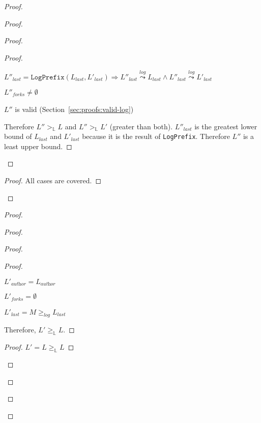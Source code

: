 \documentclass[9pt, oneside]{article}   	%
\newcommand{\logleadsto}{\overset{\textit{log}}\leadsto}
\begin{document}
\begin{proof}
\begin{proof}
\begin{proof}
			\begin{proof}
				\begin{pfenum}
					\item $L''_\textit{last} = \texttt{LogPrefix}(L_\textit{last}, L'_\textit{last}) \Rightarrow  L''_\textit{last} \logleadsto L_\textit{last} \wedge L''_\textit{last} \logleadsto L'_\textit{last} $ 
					\item $L''_\textit{forks} \neq \emptyset$
					\item $L''$ is valid (Section~\ref{sec:proofs:valid-log})
				\end{pfenum}
				Therefore $L'' >_\mathds{L} L$ and $L'' >_\mathds{L} L'$ (greater than both). $L''_\textit{last}$ is the greatest lower bound of $L_\textit{last}$ and $L'_\textit{last}$ because it is the result of \texttt{LogPrefix}. Therefore $L''$ is a least upper bound.
			\end{proof}
		\end{proof}
		\qedstep{}
		\begin{proof}
			All cases are covered.
		\end{proof}
	\end{proof}
	
	\begin{proof}
	
		\begin{proof}

				\begin{proof}
					\step{}{\case{$L_\textit{last} \logleadsto M$}}
					\begin{proof}
						\begin{pfenum}
							\item $L'_\textit{author} = L_\textit{author}$
							\item $L'_\textit{forks} = \emptyset$
							\item $L'_\textit{last} = M \geq_\textit{log} L_\textit{last}$
						\end{pfenum}
						Therefore, $L' \geq_\mathds{L} L$.
					\end{proof}
					
					\begin{proof}
						$L' = L \geq_\mathds{L} L$
					\end{proof}
					

\end{proof}
\end{proof}
\end{proof}
\end{proof}
\end{document}
